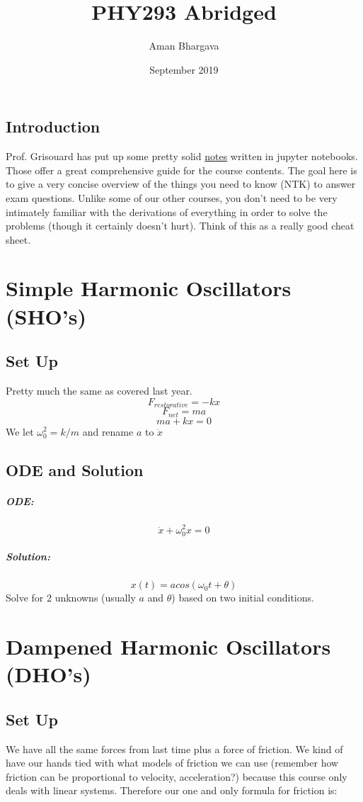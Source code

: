 \documentclass[a4paper,12pt]{report}
\begin{document}
\title{PHY293 Abridged}
\author{Aman Bhargava}
\date{September 2019}
\maketitle

\tableofcontents

\section{Introduction}
Prof. Grisouard has put up some pretty solid 
\href{https://github.com/PHY293-Grisouard/Chapters-2019}{notes} written in jupyter notebooks. 
Those offer a great comprehensive guide for the course contents. The goal here is to give
a very concise overview of the things you need to know (NTK) to answer exam questions. Unlike
some of our other courses, you don't need to be very intimately familiar with the derivations
of everything in order to solve the problems (though it certainly doesn't hurt). Think of this 
as a really good cheat sheet.

\chapter{Simple Harmonic Oscillators (SHO's)}
\section{Set Up}
Pretty much the same as covered last year.
$$F_{restorative} = -kx$$
$$F_{net} = ma$$
$$ma + kx = 0$$
We let $\omega_0^2 = k/m$ and rename $a$ to $\ddot{x}$
\section{ODE and Solution}
\paragraph{ODE:}
$$\ddot{x} + \omega_0^2 x = 0$$
\paragraph{Solution:}
$$x(t) = a cos(\omega_0 t + \theta)$$
Solve for 2 unknowns (usually $a$ and $\theta$) based on two initial conditions.

\chapter{Dampened Harmonic Oscillators (DHO's)}
\section{Set Up}
We have all the same forces from last time plus a force of friction. We kind of have our
hands tied with what models of friction we can use (remember how friction can be proportional
to velocity, acceleration?) because this course only deals with linear systems. Therefore our
one and only formula for friction is:
\end{document}
